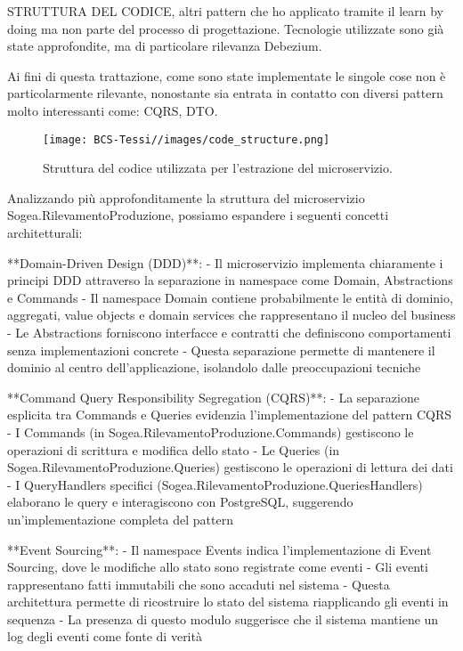         STRUTTURA DEL CODICE, altri pattern che ho applicato tramite il learn by doing ma non parte del processo di progettazione. 
        Tecnologie utilizzate sono già state approfondite, ma di particolare rilevanza Debezium.

        Ai fini di questa trattazione, come sono state implementate le singole cose non è particolarmente rilevante, nonostante sia entrata in contatto con diversi pattern molto interessanti come: CQRS, DTO. 
        \begin{figure}[H]
            \centering
            \texttt{[image: BCS-Tessi//images/code\_structure.png]}
            \caption{Struttura del codice utilizzata per l'estrazione del microservizio.}
            \label{fig:code-structure}
        \end{figure}

        
        Analizzando più approfonditamente la struttura del microservizio Sogea.RilevamentoProduzione, possiamo espandere i seguenti concetti architetturali:

**Domain-Driven Design (DDD)**:
- Il microservizio implementa chiaramente i principi DDD attraverso la separazione in namespace come Domain, Abstractions e Commands
- Il namespace Domain contiene probabilmente le entità di dominio, aggregati, value objects e domain services che rappresentano il nucleo del business
- Le Abstractions forniscono interfacce e contratti che definiscono comportamenti senza implementazioni concrete
- Questa separazione permette di mantenere il dominio al centro dell'applicazione, isolandolo dalle preoccupazioni tecniche

**Command Query Responsibility Segregation (CQRS)**:
- La separazione esplicita tra Commands e Queries evidenzia l'implementazione del pattern CQRS
- I Commands (in Sogea.RilevamentoProduzione.Commands) gestiscono le operazioni di scrittura e modifica dello stato
- Le Queries (in Sogea.RilevamentoProduzione.Queries) gestiscono le operazioni di lettura dei dati
- I QueryHandlers specifici (Sogea.RilevamentoProduzione.QueriesHandlers) elaborano le query e interagiscono con PostgreSQL, suggerendo un'implementazione completa del pattern

**Event Sourcing**:
- Il namespace Events indica l'implementazione di Event Sourcing, dove le modifiche allo stato sono registrate come eventi
- Gli eventi rappresentano fatti immutabili che sono accaduti nel sistema
- Questa architettura permette di ricostruire lo stato del sistema riapplicando gli eventi in sequenza
- La presenza di questo modulo suggerisce che il sistema mantiene un log degli eventi come fonte di verità

